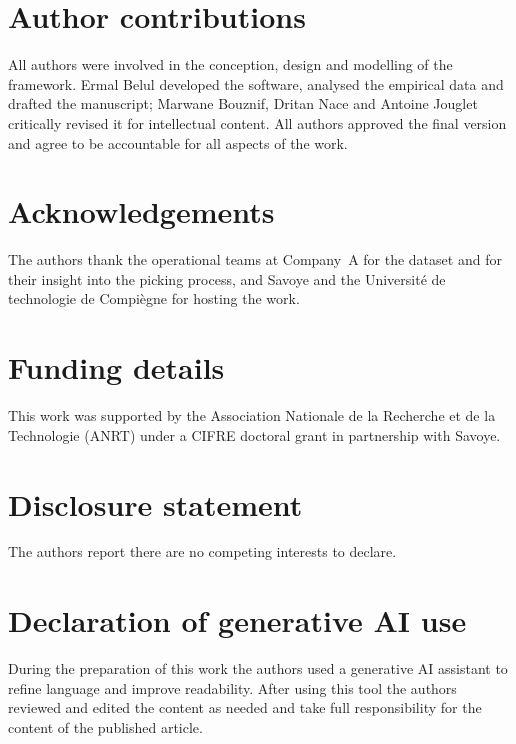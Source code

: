 \documentclass[]{interact}
\begin{document}
\section*{Author contributions}
All authors were involved in the conception, design and modelling of the framework. Ermal Belul developed the software, analysed the empirical data and drafted the manuscript; Marwane Bouznif, Dritan Nace and Antoine Jouglet critically revised it for intellectual content. All authors approved the final version and agree to be accountable for all aspects of the work.

\section*{Acknowledgements}
The authors thank the operational teams at Company~A for the dataset and for their insight into the picking process, and Savoye and the Universit\'{e} de technologie de Compi\`{e}gne for hosting the work.

\section*{Funding details}
This work was supported by the Association Nationale de la Recherche et de la Technologie (ANRT) under a CIFRE doctoral grant in partnership with Savoye.

\section*{Disclosure statement}
The authors report there are no competing interests to declare.

\section*{Declaration of generative AI use}
During the preparation of this work the authors used a generative AI assistant to refine language and improve readability. After using this tool the authors reviewed and edited the content as needed and take full responsibility for the content of the published article.
\end{document}
